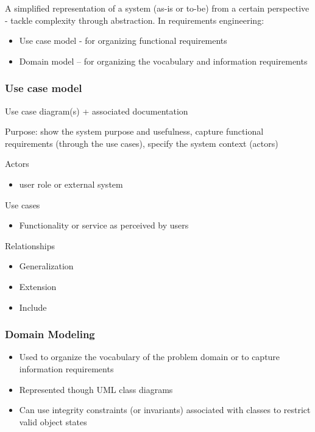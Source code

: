 \documentclass[../ESOF_notes.tex]{subfiles}
\begin{document}
A simplified representation of a system (as-is or to-be) from a certain perspective - tackle complexity through abstraction. In requirements engineering:
\begin{itemize}
    \item Use case model - for organizing functional requirements
    \item Domain model – for organizing the vocabulary and information requirements
\end{itemize}


\subsubsection{Use case model}
Use case diagram(s) + associated documentation

Purpose: show the system purpose and usefulness, capture functional requirements (through the use cases), specify the system context (actors)

Actors
\begin{itemize}
    \item user role or external system
\end{itemize}

Use cases
\begin{itemize}
    \item Functionality or service as perceived by users
\end{itemize}

Relationships

\begin{itemize}
    \item Generalization
    \item Extension
    \item Include
\end{itemize}

\subsubsection{Domain Modeling}
\begin{itemize}
    \item Used to organize the vocabulary of the problem domain or to capture information requirements
    \item Represented though UML class diagrams
    \item Can use integrity constraints (or invariants) associated with classes to restrict valid object states
\end{itemize}
\end{document}
